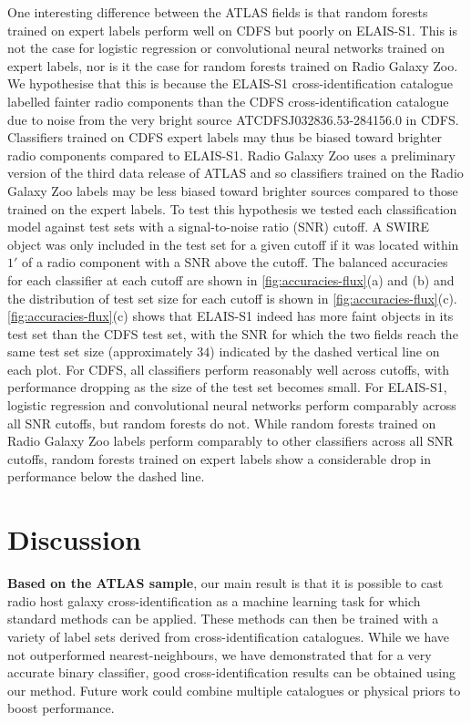 \documentclass[fleqn,usenatbib,usedcolumn]{mnras}
\newcommand{\edited}[1]{{\bf {#1}}}
\begin{document}
  One interesting difference between the ATLAS fields is that random forests
  trained on expert labels perform well on CDFS but poorly on ELAIS-S1. This
  is not the case for logistic regression or convolutional neural networks
  trained on expert labels, nor is it the case for random forests trained on
  Radio Galaxy Zoo. We hypothesise that this is because the ELAIS-S1
  cross-identification catalogue \citep{middelberg08} labelled fainter radio
  components than the CDFS cross-identification catalogue \citep{norris06} due
  to noise from the very bright source
  ATCDFS\textunderscore{}J032836.53-284156.0 in CDFS. Classifiers trained on
  CDFS expert labels may thus be biased toward brighter radio components
  compared to ELAIS-S1. Radio Galaxy Zoo uses a preliminary version of the third data release of ATLAS
  \citep{franzen15} and so classifiers trained on the Radio Galaxy Zoo labels
  may be less biased toward brighter sources compared to those trained on the
  expert labels. To test this hypothesis we tested each classification model against
  test sets with a signal-to-noise ratio (SNR) cutoff. A SWIRE object was only
  included in the test set for a given cutoff if it was located within $1'$ of
  a radio component with a SNR above the cutoff. The balanced accuracies for
  each classifier at each cutoff are shown in \autoref{fig:accuracies-flux}(a)
  and (b) and the distribution of test set size for each cutoff is shown in
  \autoref{fig:accuracies-flux}(c). \autoref{fig:accuracies-flux}(c) shows
  that ELAIS-S1 indeed has more faint objects in its test set than the CDFS test set, with the SNR for
  which the two fields reach the same test set size (approximately $34$)
  indicated by the dashed vertical line on each plot. For CDFS, all
  classifiers perform reasonably well across cutoffs, with performance
  dropping as the size of the test set becomes small. For ELAIS-S1, logistic
  regression and convolutional neural networks perform comparably across all
  SNR cutoffs, but random forests do not. While random forests trained on
  Radio Galaxy Zoo labels perform comparably to other classifiers across all
  SNR cutoffs, random forests trained on expert labels show a considerable
  drop in performance below the dashed line.

\section{Discussion}

  \edited{Based on the ATLAS sample}, our main result is that it is possible
  to cast radio host galaxy cross-identification as a machine learning task
  for which standard methods can be applied. These methods can then be trained
  with a variety of label sets derived from cross-identification catalogues.
  While we have not outperformed nearest-neighbours, we have demonstrated that
  for a very accurate binary classifier, good cross-identification results can
  be obtained using our method. Future work could combine multiple catalogues
  or physical priors to boost performance.
\end{document}
